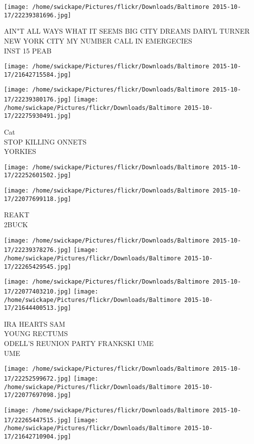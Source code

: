 \documentclass[10pt,letterpaper]{article}
\begin{document}
\vspace{0.25in}
\texttt{[image: /home/swickape/Pictures/flickr/Downloads/Baltimore 2015-10-17/22239381696.jpg]}

AIN"T ALL WAYS WHAT IT SEEMS BIG CITY DREAMS DARYL TURNER NEW YORK CITY MY NUMBER CALL IN EMERGECIES\\
INST 15 PEAB
\pagebreak

\texttt{[image: /home/swickape/Pictures/flickr/Downloads/Baltimore 2015-10-17/21642715584.jpg]}

\vspace{0.25in}
\texttt{[image: /home/swickape/Pictures/flickr/Downloads/Baltimore 2015-10-17/22239380176.jpg]}
\texttt{[image: /home/swickape/Pictures/flickr/Downloads/Baltimore 2015-10-17/22275930491.jpg]}

Cat\\
STOP KILLING ONNETS\\
YORKIES
\pagebreak

\texttt{[image: /home/swickape/Pictures/flickr/Downloads/Baltimore 2015-10-17/22252601502.jpg]}

\vspace{0.25in}
\texttt{[image: /home/swickape/Pictures/flickr/Downloads/Baltimore 2015-10-17/22077699118.jpg]}

REAKT\\
2BUCK
\pagebreak

\texttt{[image: /home/swickape/Pictures/flickr/Downloads/Baltimore 2015-10-17/22239378276.jpg]}
\texttt{[image: /home/swickape/Pictures/flickr/Downloads/Baltimore 2015-10-17/22265429545.jpg]}

\texttt{[image: /home/swickape/Pictures/flickr/Downloads/Baltimore 2015-10-17/22077403210.jpg]}
\texttt{[image: /home/swickape/Pictures/flickr/Downloads/Baltimore 2015-10-17/21644400513.jpg]}

IRA HEARTS SAM\\
YOUNG RECTUMS\\
ODELL'S REUNION PARTY FRANKSKI UME\\
UME
\pagebreak

\texttt{[image: /home/swickape/Pictures/flickr/Downloads/Baltimore 2015-10-17/22252599672.jpg]}
\texttt{[image: /home/swickape/Pictures/flickr/Downloads/Baltimore 2015-10-17/22077697098.jpg]}

\texttt{[image: /home/swickape/Pictures/flickr/Downloads/Baltimore 2015-10-17/22265447515.jpg]}
\texttt{[image: /home/swickape/Pictures/flickr/Downloads/Baltimore 2015-10-17/21642710904.jpg]}
\end{document}
